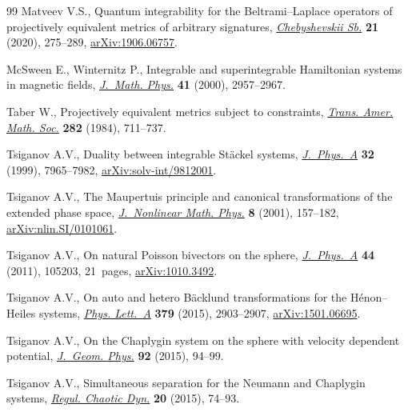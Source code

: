 \documentclass[pdftex]{sigma}
\numberwithin{equation}{section}
\begin{document}
\begin{thebibliography}{99}
Matveev V.S., Quantum integrability for the {B}eltrami--{L}aplace operators of
  projectively equivalent metrics of arbitrary signatures,
  \href{https://doi.org/10.22405/2226-8383-2020-21-2-275-289}{\textit{Chebyshevskii Sb.}} \textbf{21} (2020), 275--289, \href{https://arxiv.org/abs/1906.06757}{arXiv:1906.06757}.

McSween E., Winternitz P., Integrable and superintegrable {H}amiltonian systems
  in magnetic fields, \href{https://doi.org/10.1063/1.533283}{\textit{J.~Math. Phys.}} \textbf{41} (2000), 2957--2967.

Taber W., Projectively equivalent metrics subject to constraints,
  \href{https://doi.org/10.2307/1999261}{\textit{Trans. Amer. Math. Soc.}} \textbf{282} (1984), 711--737.

Tsiganov A.V., Duality between integrable {S}t\"ackel systems,
  \href{https://doi.org/10.1088/0305-4470/32/45/311}{\textit{J.~Phys.~A}} \textbf{32} (1999), 7965--7982,
  \href{https://arxiv.org/abs/solv-int/9812001}{arXiv:solv-int/9812001}.

Tsiganov A.V., The {M}aupertuis principle and canonical transformations of the
  extended phase space, \href{https://doi.org/10.2991/jnmp.2001.8.1.12}{\textit{J.~Nonlinear Math. Phys.}} \textbf{8} (2001),
  157--182, \href{https://arxiv.org/abs/nlin.SI/0101061}{arXiv:nlin.SI/0101061}.

Tsiganov A.V., On natural {P}oisson bivectors on the sphere,
  \href{https://doi.org/10.1088/1751-8113/44/10/105203}{\textit{J.~Phys.~A}} \textbf{44} (2011), 105203, 21~pages, \href{https://arxiv.org/abs/1010.3492}{arXiv:1010.3492}.

Tsiganov A.V., On auto and hetero {B}\"acklund transformations for the
  {H}\'{e}non--{H}eiles systems, \href{https://doi.org/10.1016/j.physleta.2015.08.023}{\textit{Phys. Lett.~A}} \textbf{379} (2015),
  2903--2907, \href{https://arxiv.org/abs/1501.06695}{arXiv:1501.06695}.

Tsiganov A.V., On the {C}haplygin system on the sphere with velocity dependent
  potential, \href{https://doi.org/10.1016/j.geomphys.2015.02.006}{\textit{J.~Geom. Phys.}} \textbf{92} (2015), 94--99.

Tsiganov A.V., Simultaneous separation for the {N}eumann and {C}haplygin
  systems, \href{https://doi.org/10.1134/S1560354715010062}{\textit{Regul. Chaotic Dyn.}} \textbf{20} (2015), 74--93.


\end{thebibliography}
\end{document}
